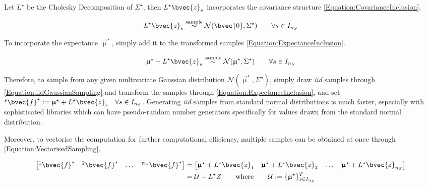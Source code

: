 			Let $L^{\star}$ be the Cholesky Decomposition of $\Sigma^{\star}$, then $L^{\star} \bvec{z}_{s}$ incorporates the covariance structure \eqref{Equation:CovarianceInclusion}.
			
			\begin{equation}
				\begin{aligned}
					L^{\star} \bvec{z}_{s} \stackrel{\text{sample}}{\sim} \mathcal{N}(\bvec{0}, \Sigma^{\star}) \qquad \forall s \in I_{n_{S}}
				\end{aligned}
			\label{Equation:CovarianceInclusion}
			\end{equation}
			
			To incorporate the expectance $\vec{\upmu}^{\star}$, simply add it to the transformed samples \eqref{Equation:ExpectanceInclusion}.
			
			\begin{equation}
				\begin{aligned}
					\vec{\upmu}^{\star} + L^{\star} \bvec{z}_{s} \stackrel{\text{sample}}{\sim} \mathcal{N}(\vec{\upmu}^{\star}, \Sigma^{\star}) \qquad \forall s \in I_{n_{S}}
				\end{aligned}
			\label{Equation:ExpectanceInclusion}
			\end{equation}
			
			Therefore, to sample from any given multivariate Gaussian distribution $\mathcal{N}(\vec{\upmu}^{\star}, \Sigma^{\star})$, simply draw \textit{iid} samples through \eqref{Equation:iidGaussianSampling} and transform the samples through \eqref{Equation:ExpectanceInclusion}, and set ${^{s}}\bvec{f}^{\star} := \vec{\upmu}^{\star} + L^{\star} \bvec{z}_{s} \quad \forall s \in I_{n_{S}}$. Generating \textit{iid} samples from standard normal distributions is much faster, especially with sophisticated libraries which can have pseudo-random number generators specifically for values drawn from the standard normal distribution.
			
			Moreover, to vectorise the computation for further computational efficiency, multiple samples can be obtained at once through \eqref{Equation:VectorisedSampling}.
			
			\begin{equation}
				\begin{aligned}
					\begin{bmatrix} {^{1}}\bvec{f}^{\star} & {^{2}}\bvec{f}^{\star} & \dots & {^{n_{S}}}\bvec{f}^{\star} \end{bmatrix} &= \begin{bmatrix} \vec{\upmu}^{\star} + L^{\star} \bvec{z}_{1} & \vec{\upmu}^{\star} + L^{\star} \bvec{z}_{2} & \dots & \vec{\upmu}^{\star} + L^{\star} \bvec{z}_{n_{S}} \end{bmatrix} \\
					&= \mathcal{U} + L^{\star} Z \qquad \text{where} \qquad \mathcal{U} := \{\vec{\upmu}^{\star}\}^{T}_{s \in I_{n_{S}}}
				\end{aligned}
			\label{Equation:VectorisedSampling}
			\end{equation}			
			
